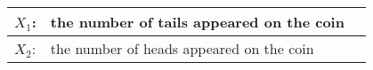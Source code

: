 \begin{tabular}{|l|l|l|}\hline
$X_1$:	& the number of tails appeared on the coin	\\\hline
$X_2$:	& the number of heads appeared on the coin	\\\hline
\end{tabular}
